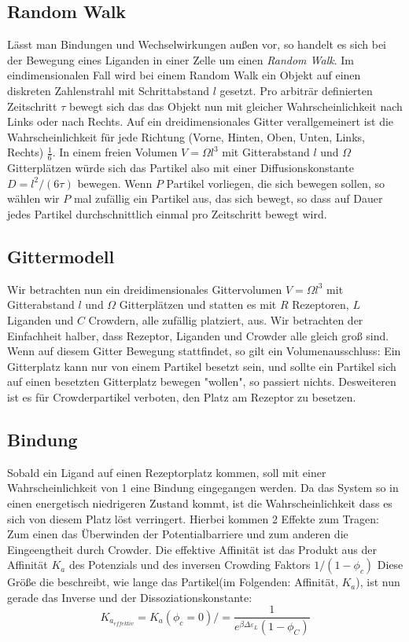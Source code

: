 \documentclass[bachelor,       %
               twoside,        %
               BCOR10mm,       %
               english,ngerman, %
               ]{GAUBM}
\begin{document}
\subsection{Random Walk}
Lässt man Bindungen und Wechselwirkungen außen vor, so handelt es sich bei der
Bewegung eines Liganden in einer Zelle um einen \emph{Random Walk}.
Im eindimensionalen Fall wird bei einem Random Walk ein Objekt auf
einen diskreten Zahlenstrahl mit Schrittabstand $l$ gesetzt.
Pro arbiträr definierten Zeitschritt $\tau$ bewegt sich das das Objekt nun mit gleicher Wahrscheinlichkeit
nach Links oder nach Rechts. Auf ein dreidimensionales Gitter verallgemeinert ist die Wahrscheinlichkeit
für jede Richtung (Vorne, Hinten, Oben, Unten, Links, Rechts) $\frac{1}{6}$.
In einem freien Volumen $V = \Omega l^3$ mit Gitterabstand $l$ und $\Omega$ Gitterplätzen
würde sich das Partikel also mit einer Diffusionskonstante $D = l^2 / (6\tau)$ bewegen.
Wenn $P$ Partikel vorliegen, die sich bewegen sollen, so wählen wir $P$ mal zufällig ein Partikel aus,
das sich bewegt, so dass auf Dauer jedes Partikel durchschnittlich einmal pro Zeitschritt bewegt wird.

\subsection{Gittermodell}
Wir betrachten nun ein dreidimensionales Gittervolumen
$V = \Omega l^3$ mit Gitterabstand $l$ und $\Omega$ Gitterplätzen und statten es mit
$R$ Rezeptoren, $L$ Liganden und $C$ Crowdern, alle zufällig platziert, aus.
Wir betrachten der Einfachheit halber, dass Rezeptor, Liganden und Crowder alle gleich groß sind.
Wenn auf diesem Gitter Bewegung stattfindet, so gilt ein Volumenausschluss: Ein Gitterplatz kann nur
von einem Partikel besetzt sein, und sollte ein Partikel sich auf einen besetzten Gitterplatz bewegen
"wollen", so passiert nichts. Desweiteren ist es für Crowderpartikel verboten, den Platz am Rezeptor zu
besetzen.
\subsection{Bindung}
Sobald ein Ligand auf einen Rezeptorplatz kommen, soll mit einer Wahrscheinlichkeit von
1 eine Bindung eingegangen werden. Da das System so in einen energetisch niedrigeren
Zustand kommt, ist die Wahrscheinlichkeit dass es sich von diesem Platz löst verringert.
Hierbei kommen 2 Effekte zum Tragen: Zum einen das Überwinden der Potentialbarriere und zum anderen
die Eingeengtheit durch Crowder. Die effektive Affinität ist das Produkt aus der Affinität $K_a$ des Potenzials und
des inversen Crowding Faktors $1/(1-\phi_c)$
Diese Größe die beschreibt, wie lange das Partikel(im Folgenden: Affinität, $K_a$), ist nun gerade das Inverse und der Dissoziationskonstante:
\begin{equation}
K_{a_{effektiv}} = K_a(\phi_c = 0) / =\frac{1}{e^{\beta\Delta\varepsilon_L}(1-\phi_C)}
\end{equation}
\end{document}
